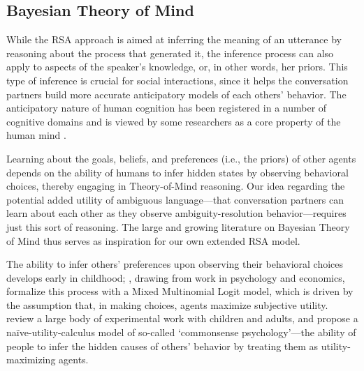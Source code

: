 \documentclass[11pt,a4paper]{article}
\begin{document}
\subsection{Bayesian Theory of Mind} \label{inferring}

While the RSA approach is aimed at inferring the meaning of an utterance by reasoning about the process that generated it, the inference process can also apply to aspects of the speaker's knowledge, or, in other words, her priors. This type of inference is crucial for social interactions, since it helps the conversation partners build more accurate anticipatory models of each others' behavior. The anticipatory nature of human cognition has been registered in a number of cognitive domains \cite{Butz:2016, belardinelli2016s, belardinelli2018mental,Friston:2015,Hayhoe:2003,lohmann2019hands} and is viewed by some researchers as a core property of the human mind \cite{Butz:2008h,Clark:2016}. 


Learning about the goals, beliefs, and preferences (i.e., the priors) of other agents depends on the ability of humans to infer hidden states by observing behavioral choices, thereby engaging in Theory-of-Mind reasoning. Our idea regarding the potential added utility of ambiguous language---that conversation partners can learn about each other as they observe ambiguity-resolution behavior---requires just this sort of reasoning. The large and growing literature on Bayesian Theory of Mind \cite{Baker:2009,baker2017rational} thus serves as inspiration for our own extended RSA model.

The ability to infer others' preferences upon observing their behavioral choices develops early in childhood; , drawing from work in psychology and economics, formalize this process with a Mixed Multinomial Logit model, which is driven by the assumption that, in making choices, agents maximize subjective utility.  review a large body of experimental work with children and adults, and propose a na{\"i}ve-utility-calculus model of so-called `commonsense psychology'---the ability of people to infer the hidden causes of others' behavior by treating them as utility-maximizing agents. 

\end{document}
